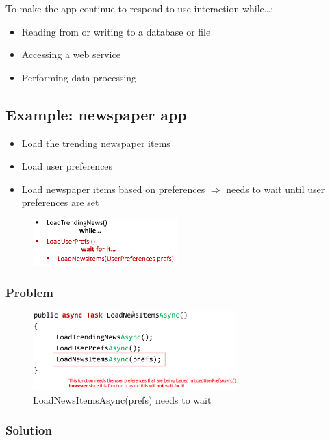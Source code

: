 \documentclass{article}
\begin{document}
To make the app continue to respond to use interaction while\dots:
\begin{itemize}
    \item Reading from or writing to a database or file
    \item Accessing a web service
    \item Performing data processing
\end{itemize}

\subsection{Example: newspaper app}

\begin{itemize}
    \item Load the trending newspaper items
    \item Load user preferences
    \item Load newspaper items based on preferences $\Rightarrow$ needs to wait until user preferences are set
\end{itemize}

\begin{figure}[H]
    \centering
    \includegraphics[width=0.5\textwidth]{async-news.png}
    \caption{}
\end{figure}


\subsubsection{Problem}

\begin{figure}[H]
    \centering
    \includegraphics[width=0.7\textwidth]{async-news-problem.png}
    \caption{LoadNewsItemsAsync(prefs) needs to wait}
\end{figure}

\subsubsection{Solution}
\end{document}
